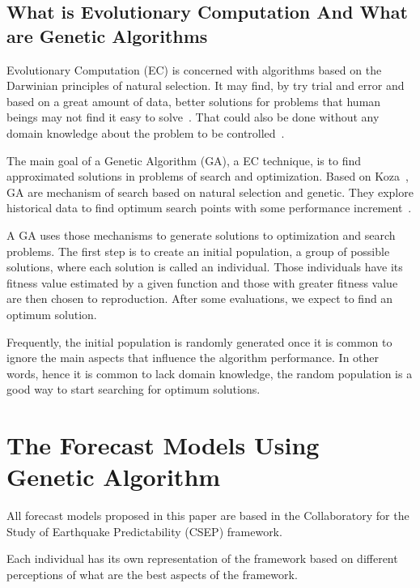 \subsection{What is Evolutionary Computation And What are Genetic Algorithms}\label{EC}
Evolutionary Computation (EC) is concerned with algorithms based on
the Darwinian principles of natural selection. It may find, by try
trial and error and based on a great amount of data, better solutions
for problems that human beings may not find it easy to
solve~\cite{koza2003genetic}. That could also be done without any
domain knowledge about the problem to be
controlled~\cite{Michie94machinelearning}.
	
The main goal of a Genetic Algorithm (GA), a EC technique, is to find
approximated solutions in problems of search and optimization. Based
on Koza~\cite{koza2003genetic}, GA are mechanism of search based on
natural selection and genetic. They explore historical data to find
optimum search points with some performance
increment~\cite{Goldberg:1989:GAS:534133}.

A GA uses those mechanisms to generate solutions to optimization and
search problems. The first step is to create an initial population, a
group of possible solutions, where each solution is called an
individual. Those individuals have its fitness value estimated by a
given function and those with greater fitness value are then chosen to
reproduction. After some evaluations, we expect to find an optimum
solution.

Frequently, the initial population is randomly generated once it is
common to ignore the main aspects that influence the algorithm
performance. In other words, hence it is common to lack domain
knowledge, the random population is a good way to start searching for
optimum solutions.

\section{The Forecast Models Using Genetic Algorithm}\label{Models}

All forecast models proposed in this paper are based in the
Collaboratory for the Study of Earthquake Predictability (CSEP)
framework.

Each individual has its own representation of the framework based on
different perceptions of what are the best aspects of the framework.

